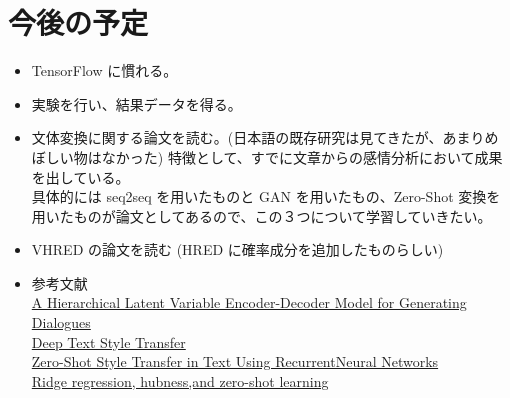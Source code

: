 \documentclass[dvipdfmx,10pt,presentation]{beamer}
\begin{document}
\section{今後の予定}
\label{sec:orgae67673}
\begin{frame}[allowframebreaks]{}
\begin{itemize}
\item TensorFlow に慣れる。\\
\item 実験を行い、結果データを得る。\\
\item 文体変換に関する論文を読む。(日本語の既存研究は見てきたが、あまりめぼしい物はなかった)  特徴として、すでに文章からの感情分析において成果を出している。\\
具体的には seq2seq を用いたものと GAN を用いたもの、Zero-Shot 変換を用いたものが論文としてあるので、この３つについて学習していきたい。\\
\item VHRED の論文を読む (HRED に確率成分を追加したものらしい)\\
\item 参考文献\\
\href{https://arxiv.org/pdf/1605.06069.pdf}{A Hierarchical Latent Variable Encoder-Decoder Model for Generating Dialogues}\\
\href{http://www.cs.tau.ac.il/\~joberant/teaching/advanced\_nlp\_spring\_2018/past\_projects/style\_transfer.pdf}{Deep Text Style Transfer}\\
\href{https://arxiv.org/pdf/1711.04731.pdf}{Zero-Shot Style Transfer in Text Using RecurrentNeural Networks}\\
\href{http://cl.naist.jp/\~yutaro-s/download/Shigeto\_NL222\_slides.pdf}{Ridge regression, hubness,and zero-shot learning}\\
\end{itemize}
\end{frame}
\end{document}
